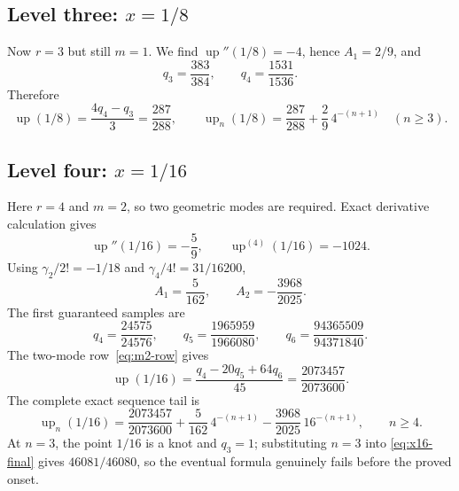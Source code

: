 \documentclass[11pt,a4paper]{article}
\theoremstyle{remark}
\newcommand{\up}{\operatorname{up}}
\begin{document}
\subsection{Level three: \texorpdfstring{$x=1/8$}{x=1/8}}

Now $r=3$ but still $m=1$.  We find
$\up''(1/8)=-4$, hence $A_1=2/9$, and
\begin{equation}
 q_3=\frac{383}{384},
 \qquad q_4=\frac{1531}{1536}.
\end{equation}
Therefore
\begin{equation}
 \boxed{
 \up(1/8)=\frac{4q_4-q_3}{3}=\frac{287}{288},
 \qquad
 \up_n(1/8)=\frac{287}{288}+\frac29\,4^{-(n+1)}
 \quad(n\ge3). }
 \label{eq:xeighth-final}
\end{equation}

\subsection{Level four: \texorpdfstring{$x=1/16$}{x=1/16}}

Here $r=4$ and $m=2$, so two geometric modes are required.  Exact derivative
calculation gives
\begin{equation}
 \up''(1/16)=-\frac59,
 \qquad
 \up^{(4)}(1/16)=-1024.
 \label{eq:x16-derivatives}
\end{equation}
Using $\gamma_2/2!=-1/18$ and $\gamma_4/4!=31/16200$,
\begin{equation}
 A_1=\frac5{162},
 \qquad
 A_2=-\frac{3968}{2025}.
 \label{eq:x16-modes}
\end{equation}
The first guaranteed samples are
\begin{equation}
 q_4=\frac{24575}{24576},\qquad
 q_5=\frac{1965959}{1966080},\qquad
 q_6=\frac{94365509}{94371840}.
 \label{eq:x16-samples}
\end{equation}
The two-mode row~\eqref{eq:m2-row} gives
\begin{equation}
 \boxed{
 \up(1/16)=\frac{q_4-20q_5+64q_6}{45}
 =\frac{2073457}{2073600}. }
 \label{eq:x16-limit}
\end{equation}
The complete exact sequence tail is
\begin{equation}
 \boxed{
 \up_n(1/16)=\frac{2073457}{2073600}
 +\frac5{162}\,4^{-(n+1)}
 -\frac{3968}{2025}\,16^{-(n+1)},
 \qquad n\ge4. }
 \label{eq:x16-final}
\end{equation}
At $n=3$, the point $1/16$ is a knot and $q_3=1$; substituting $n=3$ into
\eqref{eq:x16-final} gives $46081/46080$, so the eventual formula genuinely
fails before the proved onset.
\end{document}
